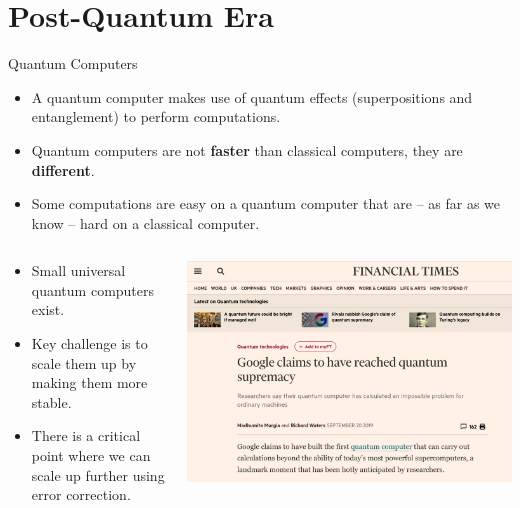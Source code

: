 \documentclass[xcolor=table,10pt,aspectratio=169]{beamer}
\begin{document}
\section{Post-Quantum Era}
\label{sec:org843ae8f}
\begin{frame}[label={sec:orga5b89b0}]{Quantum Computers}
\begin{itemize}
\item A quantum computer makes use of quantum effects (superpositions and entanglement) to perform computations.
\item Quantum computers are not \textbf{faster} than classical computers, they are \textbf{different}.
\item Some computations are easy on a quantum computer that are – as far as we know – hard on a classical computer.
\end{itemize}
\begin{columns}[t]
\begin{column}{0.5\columnwidth}
\begin{itemize}
\item Small universal quantum computers exist.
\item Key challenge is to scale them up by making them more stable.
\item There is a critical point where we can scale up further using error correction.
\end{itemize}
\end{column}
\begin{column}{0.4\columnwidth}
\begin{center}
\includegraphics[width=.9\linewidth]{./lecture-assumptions-google-72-qubit.png}
\end{center}
\end{column}
\end{columns}
\end{frame}
\end{document}
